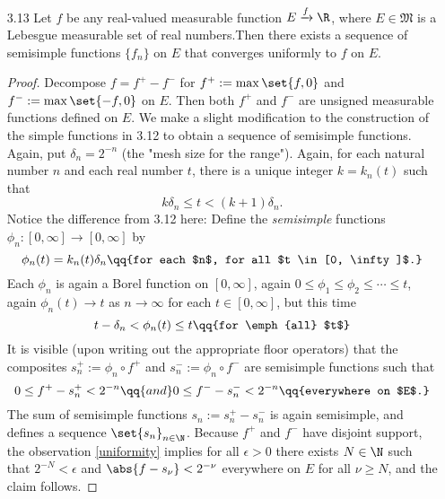 \documentclass[onesided]{ccg-pset}
\renewcommand{\sM}{\mathfrak{M}}
\begin{document}
\begin{enumerate}
\begin{proof}
All that remains is to define the sequences of monotonically increasing, respectively decreasing, simple functions 
$\phi_n \colon E \to [-b,b]$ and $\psi_n \colon E \to [-b,b]$ by
\begin{equation*}
    \phi_n(x) = \gamma_n(x) - b \qq{and} \psi_n(x) = b - \eta_n(x) \qq{for each $x \in E$ and each $n \in \N$.}
\end{equation*}
It follows that
\[
0 \le f - \phi_n < 2^{-n} \qq{and} 0 \le \psi_n - f < 2^{-n} \qq{everywhere on $E$ once $n$ is larger than $2b$,}
\] 
which implies $\phi_n \nearrow f$ uniformly from below and $\psi_n \searrow f$ uniformly from above.
\end{proof}

\item[3.13] Let $f$ be any real-valued measurable function $E \xrightarrow{f} \R$, where $E \in \sM$ is a Lebesgue measurable set of real numbers.Then there exists a sequence of semisimple functions $\{f_n\}$ on $E$ that converges uniformly to $f$ on $E$.

\begin{proof}
Decompose $f = f^{+} - f^{-}$ for $f^{+}:= \max\set{f, 0}$ and $f^{-} := \max\set{-f,0}$ on $E$. Then both $f^{+}$ and $f^{-}$ are unsigned measurable functions defined on $E$. We make a slight modification to the construction of the simple functions in 3.12 to obtain a sequence of semisimple functions. Again, put $\delta_n = 2^{-n}$ (the "mesh size for the range"). Again, for each natural number $n$ and each real number $t$, there is a unique integer $k = k_n(t)$ such that 
\[
    k\delta_n \le t < (k+1)\delta_n.
\]
Notice the difference from 3.12 here: Define the \emph{semisimple} functions $\phi_n \colon [0, \infty] \to [0,\infty]$ by
\begin{equation*}
\phi_n(t) = k_n(t)\delta_n \qq{for each $n$, for all $t \in [0, \infty]$.}
\end{equation*}
Each $\phi_n$ is again a Borel function on $[0, \infty]$, again $0 \le \phi_1 \le \phi_2 \le \cdots \le t$, again $\phi_n(t) \to t$ as $n \to \infty$ for each $t \in [0,\infty]$, but this time
\begin{equation*}
    t - \delta_n < \phi_n(t) \le t \qq{for \emph{all} $t$}
\end{equation*}
It is visible (upon writing out the appropriate floor operators) that the composites $s^+_n := \phi_n \circ f^+$ and $s^-_n := \phi_n \circ f^-$ are semisimple functions such that 
\begin{equation}
    \label{uniformity}
    0 \le f^+ - s^+_n < 2^{-n} \qq{and} 0 \le f^- - s^-_n < 2^{-n} \qq{everywhere on $E$.}
\end{equation}
The sum of semisimple functions $s_n := s_n^+ - s_n^-$ is again semisimple, and defines a sequence $\set{s_n}_{n \in \N}$. Because $f^+$ and $f^-$ have disjoint support, the observation \ref{uniformity} implies for all $\epsilon > 0$ there exists $N \in \N$ such that $2^{-N} < \epsilon$ and $\abs{f-s_\nu} < 2^{-\nu}$ everywhere on $E$ for all $\nu \ge N$, and the claim follows.
\end{proof}


\end{enumerate}
\end{document}
